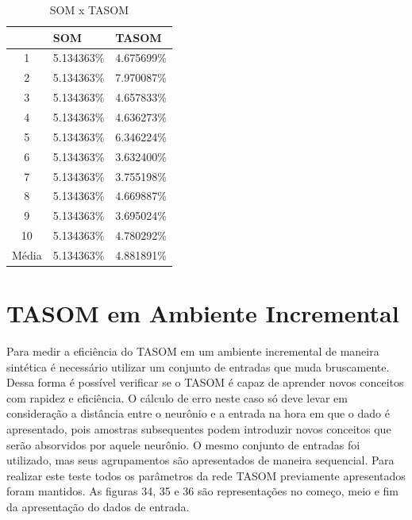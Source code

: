\begin{table}[h]
\centering
\caption{SOM x TASOM}
\label{comp}
\begin{tabular}{c|l|l|}
\cline{2-3}
                            & SOM      & TASOM    \\ \hline
\multicolumn{1}{|c|}{1}     & 5.134363\% & 4.675699\% \\ \hline
\multicolumn{1}{|c|}{2}     & 5.134363\% & 7.970087\% \\ \hline
\multicolumn{1}{|c|}{3}     & 5.134363\% & 4.657833\% \\ \hline
\multicolumn{1}{|c|}{4}     & 5.134363\% & 4.636273\% \\ \hline
\multicolumn{1}{|c|}{5}     & 5.134363\% & 6.346224\% \\ \hline
\multicolumn{1}{|c|}{6}     & 5.134363\% & 3.632400\% \\ \hline
\multicolumn{1}{|c|}{7}     & 5.134363\% & 3.755198\% \\ \hline
\multicolumn{1}{|c|}{8}     & 5.134363\% & 4.669887\% \\ \hline
\multicolumn{1}{|c|}{9}     & 5.134363\% & 3.695024\% \\ \hline
\multicolumn{1}{|c|}{10}    & 5.134363\% & 4.780292\% \\ \hline
\multicolumn{1}{|l|}{Média} & 5.134363\% & 4.881891\% \\ \hline
\end{tabular}
\end{table}

\section{TASOM em Ambiente Incremental}
Para medir a eficiência do TASOM em um ambiente incremental de maneira sintética é necessário utilizar um conjunto de entradas que muda bruscamente. Dessa forma é possível verificar se o TASOM é capaz de aprender novos conceitos com rapidez e eficiência. O cálculo de erro neste caso só deve levar em consideração a distância entre o neurônio e a entrada na hora em que o dado é apresentado, pois amostras subsequentes podem introduzir novos conceitos que serão absorvidos por aquele neurônio. O mesmo conjunto de entradas foi utilizado, mas seus agrupamentos são apresentados de maneira sequencial. Para realizar este teste todos os parâmetros da rede TASOM previamente apresentados foram mantidos. As figuras 34, 35 e 36 são representações no começo, meio e fim da apresentação do dados de entrada.

